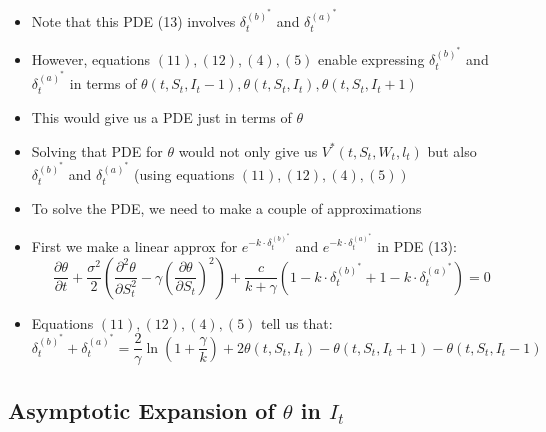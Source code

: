 \documentclass[10pt]{article}
\begin{document}
\begin{itemize} 
    \item Note that this PDE (13) involves $\delta_{t}^{(b)^{*}}$ and $\delta_{t}^{(a)^{*}}$
    \item However, equations $(11),(12),(4),(5)$ enable expressing $\delta_{t}^{(b)^{*}}$ and $\delta_{t}^{(a)^{*}}$ in terms of $\theta\left(t, S_{t}, I_{t}-1\right), \theta\left(t, S_{t}, I_{t}\right), \theta\left(t, S_{t}, I_{t}+1\right)$
    \item This would give us a PDE just in terms of $\theta$
    \item Solving that PDE for $\theta$ would not only give us $V^{*}\left(t, S_{t}, W_{t}, l_{t}\right)$ but also $\delta_{t}^{(b)^{*}}$ and $\delta_{t}^{(a)^{*}}$ (using equations $\left.(11),(12),(4),(5)\right)$
    \item To solve the PDE, we need to make a couple of approximations
    \item First we make a linear approx for $e^{-k \cdot \delta_{t}^{(b)^{*}}}$ and $e^{-k \cdot \delta_{t}^{(a)^{*}}}$ in PDE (13):
    \[
    \frac{\partial \theta}{\partial t}+\frac{\sigma^{2}}{2}\left(\frac{\partial^{2} \theta}{\partial S_{t}^{2}}-\gamma\left(\frac{\partial \theta}{\partial S_{t}}\right)^{2}\right)+\frac{c}{k+\gamma}\left(1-k \cdot \delta_{t}^{(b)^{*}}+1-k \cdot \delta_{t}^{(a)^{*}}\right)=0 \tag{14}
    \]
    \item Equations $(11),(12),(4),(5)$ tell us that:
    $$
    \delta_{t}^{(b)^{*}}+\delta_{t}^{(a)^{*}}=\frac{2}{\gamma} \ln \left(1+\frac{\gamma}{k}\right)+2 \theta\left(t, S_{t}, I_{t}\right)-\theta\left(t, S_{t}, I_{t}+1\right)-\theta\left(t, S_{t}, I_{t}-1\right)
    $$
\end{itemize}



\subsection{Asymptotic Expansion of $\theta$ in $I_{t}$}
\end{document}
